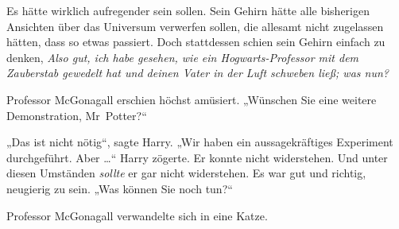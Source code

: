 Es hätte wirklich aufregender sein sollen. Sein Gehirn hätte alle bisherigen Ansichten über das Universum verwerfen sollen, die allesamt nicht zugelassen hätten, dass so etwas passiert. Doch stattdessen schien sein Gehirn einfach zu denken, \emph{Also gut, ich habe gesehen, wie ein Hogwarts-Professor mit dem Zauberstab gewedelt hat und deinen Vater in der Luft schweben ließ; was nun?}

Professor McGonagall erschien höchst amüsiert.
„Wünschen Sie eine weitere Demonstration, Mr~Potter?“

„Das ist nicht nötig“, sagte Harry.
„Wir haben ein aussagekräftiges Experiment durchgeführt. Aber …“ Harry zögerte. Er konnte nicht widerstehen. Und unter diesen Umständen \emph{sollte} er gar nicht widerstehen. Es war gut und richtig, neugierig zu sein.
„Was können Sie noch tun?“

Professor McGonagall verwandelte sich in eine Katze.

